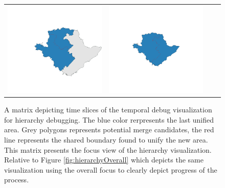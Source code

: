 \begin{figure}[p]
\begin{tabularx}{1\textwidth}{XXXX}
\includegraphics[width=1\linewidth]{images/ch6/mergefocus/22}&
\includegraphics[width=1\linewidth]{images/ch6/mergefocus/23} \\ %
\end{tabularx}
\caption{A matrix depicting time slices of the temporal debug visualization for hierarchy debugging. The blue color rerpresents the last unified area. Grey polygons represents potential merge candidates, the red line represents the shared boundary found to unify the new area. This matrix presents the focus view of the hierarchy visualization. Relative to Figure \ref{fig:hierarchyOverall} which depicts the same visualization using the overall focus to clearly depict progress of the process.} \label{fig:hierarchyFocus}
\end{figure}

